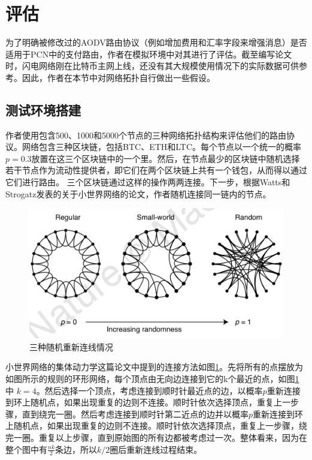 \documentclass[12pt,a4paper]{article}
\begin{document}
\clearpage

\section{评估}
为了明确被修改过的AODV路由协议（例如增加费用和汇率字段来增强消息）是否适用于PCN中的支付路由，作者在模拟环境中对其进行了评估。截至编写论文时，闪电网络刚在比特币主网上线，还没有其大规模使用情况下的实际数据可供参考。因此，作者在本节中对网络拓扑自行做出一些假设。

\subsection{测试环境搭建}
作者使用包含500、1000和5000个节点的三种网络拓扑结构来评估他们的路由协议。网络包含三种区块链，包括BTC、ETH和LTC。每个节点以一个统一的概率$p=0.3$放置在这三个区块链中的一个里。然后，在节点最少的区块链中随机选择若干节点作为流动性提供者，即它们在两个区块链上共有一个钱包，从而得以通过它们进行路由。 三个区块链通过这样的操作两两连接。下一步，根据Watts和Strogatz发表的关于小世界网络的论文，作者随机连接同一链内的节点。

\begin{figure}[htb]
\centering
\includegraphics[width=14cm]{image-20181127153048202}
\caption{\label{image-20181127153048202} 三种随机重新连线情况}
\end{figure}

小世界网络的集体动力学这篇论文中提到的连接方法如图\ref{image-20181127153048202}。先将所有的点摆放为如图所示的规则的环形网络，每个顶点由无向边连接到它的k个最近的点，如图\ref{image-20181127153048202}中 $k=4$。然后选择一个顶点，考虑连接到顺时针最近点的边，以概率$p$重新连接到环上随机点，如果出现重复的边则不连接。顺时针依次选择顶点，重复上一步骤，直到绕完一圈。然后考虑连接到顺时针第二近点的边并以概率$p$重新连接到环上随机点，如果出现重复的边则不连接。顺时针依次选择顶点，重复上一步骤，绕完一圈。重复以上步骤，直到原始图的所有边都被考虑过一次。整体看来，因为在整个图中有$\frac{nk}{2}$条边，所以$k/2$圈后重新连线过程结束\cite{watts1998collective}。
\end{document}
